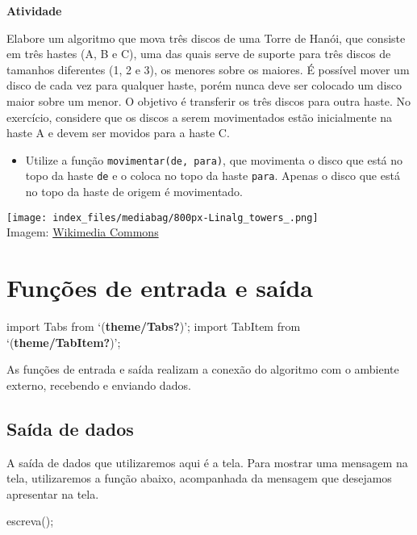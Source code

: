 \documentclass[
  letterpaper,
  DIV=11,
  numbers=noendperiod]{scrreprt}
\newenvironment{Shaded}{\begin{snugshade}}{\end{snugshade}}
\newcommand{\NormalTok}[1]{\textcolor[rgb]{0.00,0.23,0.31}{#1}}
\newcommand{\OperatorTok}[1]{\textcolor[rgb]{0.37,0.37,0.37}{#1}}
\providecommand{\tightlist}{%
  \setlength{\itemsep}{0pt}\setlength{\parskip}{0pt}}\usepackage{longtable,booktabs,array}
\begin{document}
\textbf{Atividade}

Elabore um algoritmo que mova três discos de uma Torre de Hanói, que
consiste em três hastes (A, B e C), uma das quais serve de suporte para
três discos de tamanhos diferentes (1, 2 e 3), os menores sobre os
maiores. É possível mover um disco de cada vez para qualquer haste,
porém nunca deve ser colocado um disco maior sobre um menor. O objetivo
é transferir os três discos para outra haste. No exercício, considere
que os discos a serem movimentados estão inicialmente na haste A e devem
ser movidos para a haste C.

\begin{itemize}
\tightlist
\item
  Utilize a função \texttt{movimentar(de,\ para)}, que movimenta o disco
  que está no topo da haste \texttt{de} e o coloca no topo da haste
  \texttt{para}. Apenas o disco que está no topo da haste de origem é
  movimentado.
\end{itemize}

\texttt{[image: index\_files/mediabag/800px-Linalg\_towers\_.png]}\\
Imagem:
\href{https://commons.wikimedia.org/wiki/File:Linalg_towers_of_hanoi_1.png}{Wikimedia
Commons}


\chapter{Funções de entrada e
saída}\label{funuxe7uxf5es-de-entrada-e-sauxedda}

import Tabs from `(\textbf{theme/Tabs?})'; import TabItem from
`(\textbf{theme/TabItem?})';

As funções de entrada e saída realizam a conexão do algoritmo com o
ambiente externo, recebendo e enviando dados.

\section{Saída de dados}\label{sauxedda-de-dados}

A saída de dados que utilizaremos aqui é a tela. Para mostrar uma
mensagem na tela, utilizaremos a função abaixo, acompanhada da mensagem
que desejamos apresentar na tela.

\begin{Shaded}
\begin{Highlighting}[]
\NormalTok{escreva}\OperatorTok{();}
\end{Highlighting}
\end{Shaded}
\end{document}
